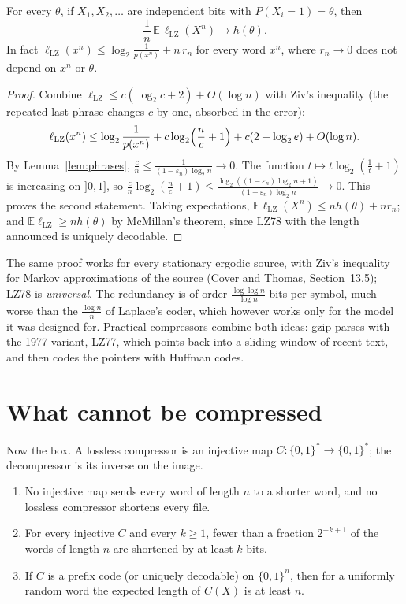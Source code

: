 \begin{theorem}\label{thm:lz}
For every $\theta$, if $X_1,X_2,\dots$ are independent bits with $P(X_i=1)=\theta$, then
\[
\frac1n\,\mathbb E\,\ell_{\mathrm{LZ}}(X^n)\longrightarrow h(\theta).
\]
In fact $\ell_{\mathrm{LZ}}(x^n)\le\log_2\frac1{p(x^n)}+n\,r_n$ for every word $x^n$, where $r_n\to0$ does not depend on $x^n$ or $\theta$.
\end{theorem}

\begin{proof}
Combine $\ell_{\mathrm{LZ}}\le c(\log_2c+2)+O(\log n)$ with Ziv's inequality (the repeated last phrase changes $c$ by one, absorbed in the error):
\[
\ell_{\mathrm{LZ}}(x^n)\le\log_2\frac1{p(x^n)}+c\log_2\Bigl(\frac nc+1\Bigr)+c(2+\log_2e)+O(\log n).
\]
By Lemma~\ref{lem:phrases}, $\frac cn\le\frac1{(1-\varepsilon_n)\log_2n}\to0$. The function $t\mapsto t\log_2(\frac1t+1)$ is increasing on $]0,1]$, so $\frac cn\log_2(\frac nc+1)\le\frac{\log_2((1-\varepsilon_n)\log_2n+1)}{(1-\varepsilon_n)\log_2n}\to0$. This proves the second statement. Taking expectations, $\mathbb E\ell_{\mathrm{LZ}}(X^n)\le nh(\theta)+nr_n$; and $\mathbb E\ell_{\mathrm{LZ}}\ge nh(\theta)$ by McMillan's theorem, since LZ78 with the length announced is uniquely decodable.
\end{proof}

The same proof works for every stationary ergodic source, with Ziv's inequality for Markov approximations of the source (Cover and Thomas, Section~13.5); LZ78 is \emph{universal}. The redundancy is of order $\frac{\log\log n}{\log n}$ bits per symbol, much worse than the $\frac{\log n}n$ of Laplace's coder, which however works only for the model it was designed for. Practical compressors combine both ideas: gzip parses with the 1977 variant, LZ77, which points back into a sliding window of recent text, and then codes the pointers with Huffman codes.

\section{What cannot be compressed}\label{sec:incompressible}

Now the box. A lossless compressor is an injective map $C:\{0,1\}^*\to\{0,1\}^*$; the decompressor is its inverse on the image.

\begin{proposition}\label{prop:nocompress}
\begin{enumerate}[label=(\alph*)]
\item No injective map sends every word of length $n$ to a shorter word, and no lossless compressor shortens every file.
\item For every injective $C$ and every $k\ge1$, fewer than a fraction $2^{-k+1}$ of the words of length $n$ are shortened by at least $k$ bits.
\item If $C$ is a prefix code (or uniquely decodable) on $\{0,1\}^n$, then for a uniformly random word the expected length of $C(X)$ is at least $n$.
\end{enumerate}
\end{proposition}

